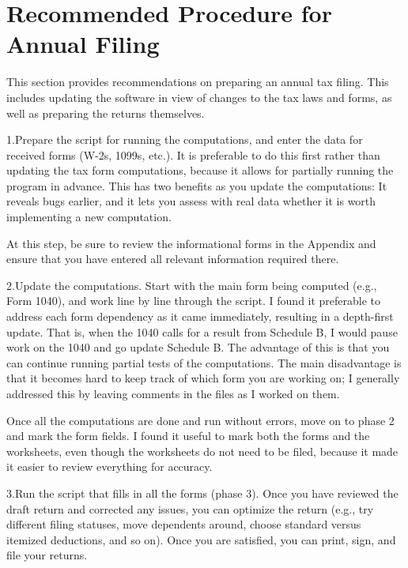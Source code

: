 \section{Recommended Procedure for Annual Filing}

This section provides recommendations on preparing an annual tax filing. This
includes updating the software in view of changes to the tax laws and forms, as
well as preparing the returns themselves.

1.\quad Prepare the script for running the computations, and enter the data for
received forms (W-2s, 1099s, etc.). It is preferable to do this first rather
than updating the tax form computations, because it allows for partially running
the program in advance. This has two benefits as you update the computations: It
reveals bugs earlier, and it lets you assess with real data whether it is worth
implementing a new computation.

At this step, be sure to review the informational forms in the Appendix and
ensure that you have entered all relevant information required there.

2.\quad Update the computations. Start with the main form being computed (e.g.,
Form 1040), and work line by line through the script. I found it preferable to
address each form dependency as it came immediately, resulting in a depth-first
update. That is, when the 1040 calls for a result from Schedule B, I would pause
work on the 1040 and go update Schedule B. The advantage of this is that you can
continue running partial tests of the computations. The main disadvantage is
that it becomes hard to keep track of which form you are working on; I generally
addressed this by leaving comments in the files as I worked on them.

Once all the computations are done and run without errors, move on to phase 2
and mark the form fields. I found it useful to mark both the forms and the
worksheets, even though the worksheets do not need to be filed, because it made
it easier to review everything for accuracy.

3.\quad Run the script that fills in all the forms (phase 3).
Once you have reviewed the draft return and corrected any issues, you can
optimize the return (e.g., try different filing statuses, move dependents
around, choose standard versus itemized deductions, and so on). Once you are
satisfied, you can print, sign, and file your returns.


